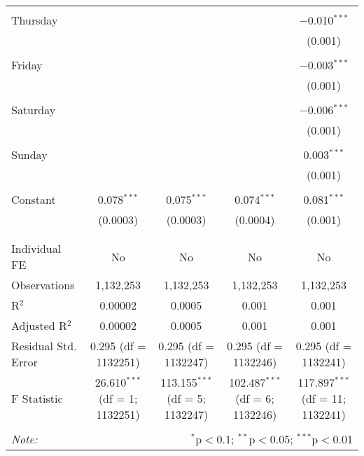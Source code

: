 \documentclass[
]{article}
\begin{document}
\begin{table}[!htbp]
{\begin{tabular}{@{\extracolsep{5pt}}lcccc}
  & & & & \\ 
 Thursday &  &  &  & $-$0.010$^{***}$ \\ 
  &  &  &  & (0.001) \\ 
  & & & & \\ 
 Friday &  &  &  & $-$0.003$^{***}$ \\ 
  &  &  &  & (0.001) \\ 
  & & & & \\ 
 Saturday &  &  &  & $-$0.006$^{***}$ \\ 
  &  &  &  & (0.001) \\ 
  & & & & \\ 
 Sunday &  &  &  & 0.003$^{***}$ \\ 
  &  &  &  & (0.001) \\ 
  & & & & \\ 
 Constant & 0.078$^{***}$ & 0.075$^{***}$ & 0.074$^{***}$ & 0.081$^{***}$ \\ 
  & (0.0003) & (0.0003) & (0.0004) & (0.001) \\ 
  & & & & \\ 
\hline \\[-1.8ex] 
Individual FE & No & No & No & No \\ 
Observations & 1,132,253 & 1,132,253 & 1,132,253 & 1,132,253 \\ 
R$^{2}$ & 0.00002 & 0.0005 & 0.001 & 0.001 \\ 
Adjusted R$^{2}$ & 0.00002 & 0.0005 & 0.001 & 0.001 \\ 
Residual Std. Error & 0.295 (df = 1132251) & 0.295 (df = 1132247) & 0.295 (df = 1132246) & 0.295 (df = 1132241) \\ 
F Statistic & 26.610$^{***}$ (df = 1; 1132251) & 113.155$^{***}$ (df = 5; 1132247) & 102.487$^{***}$ (df = 6; 1132246) & 117.897$^{***}$ (df = 11; 1132241) \\ 
\hline 
\hline \\[-1.8ex] 
\textit{Note:}  & \multicolumn{4}{r}{$^{*}$p$<$0.1; $^{**}$p$<$0.05; $^{***}$p$<$0.01} \\ 
\end{tabular}
} 
\end{table} 
\newpage
\end{document}

